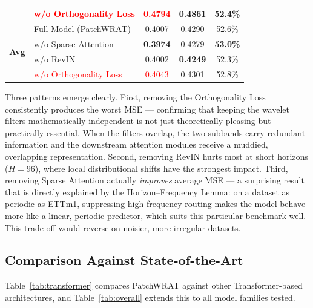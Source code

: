 \documentclass[11pt, letterpaper]{article}
\begin{document}
\begin{table}[H]
\begin{tabular}{@{}llccc@{}}
  & \textcolor{red}{w/o Orthogonality Loss} & \textcolor{red}{0.4794} & 0.4861 & 52.4\% \\
\midrule
\multirow{4}{*}{\textbf{Avg}}
  & Full Model (PatchWRAT)    & 0.4007 & 0.4290 & 52.6\% \\
  & w/o Sparse Attention      & \textbf{0.3974} & 0.4279 & \textbf{53.0\%} \\
  & w/o RevIN                 & 0.4002 & \textbf{0.4249} & 52.3\% \\
  & \textcolor{red}{w/o Orthogonality Loss} & \textcolor{red}{0.4043} & 0.4301 & 52.8\% \\
\bottomrule
\end{tabular}
\end{table}

Three patterns emerge clearly. First, removing the Orthogonality Loss consistently produces
the worst MSE — confirming that keeping the wavelet filters mathematically independent is not
just theoretically pleasing but practically essential. When the filters overlap, the two
subbands carry redundant information and the downstream attention modules receive a muddied,
overlapping representation. Second, removing RevIN hurts most at short horizons ($H=96$),
where local distributional shifts have the strongest impact. Third, removing Sparse Attention
actually \emph{improves} average MSE — a surprising result that is directly explained by the
Horizon–Frequency Lemma: on a dataset as periodic as ETTm1, suppressing high-frequency routing
makes the model behave more like a linear, periodic predictor, which suits this particular
benchmark well. This trade-off would reverse on noisier, more irregular datasets.

\subsection{Comparison Against State-of-the-Art}

Table~\ref{tab:transformer} compares PatchWRAT against other Transformer-based architectures,
and Table~\ref{tab:overall} extends this to all model families tested.
\end{document}
